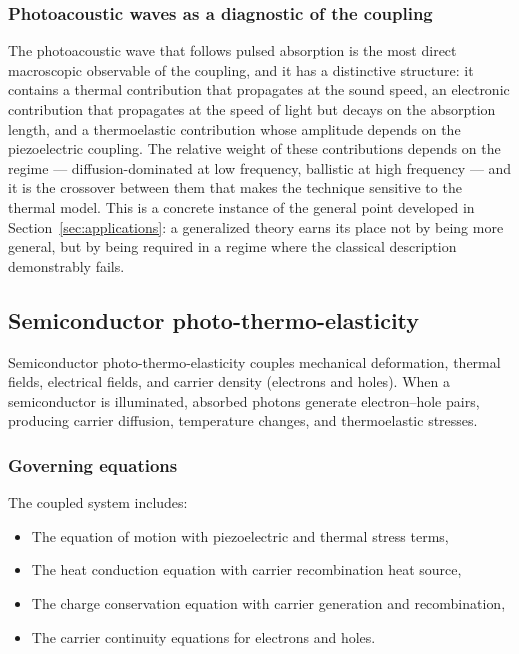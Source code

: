 \subsubsection{Photoacoustic waves as a diagnostic of the coupling}

The photoacoustic wave that follows pulsed absorption is the most direct macroscopic observable of the coupling, and it has a distinctive structure: it contains a thermal contribution that propagates at the sound speed, an electronic contribution that propagates at the speed of light but decays on the absorption length, and a thermoelastic contribution whose amplitude depends on the piezoelectric coupling. The relative weight of these contributions depends on the regime --- diffusion-dominated at low frequency, ballistic at high frequency --- and it is the crossover between them that makes the technique sensitive to the thermal model. This is a concrete instance of the general point developed in Section~\ref{sec:applications}: a generalized theory earns its place not by being more general, but by being required in a regime where the classical description demonstrably fails.

\subsection{Semiconductor photo-thermo-elasticity}
\label{sec:5.6}

Semiconductor photo-thermo-elasticity couples mechanical deformation, thermal fields, electrical fields, and carrier density (electrons and holes). When a semiconductor is illuminated, absorbed photons generate electron--hole pairs, producing carrier diffusion, temperature changes, and thermoelastic stresses.

\subsubsection{Governing equations}

The coupled system includes:
\begin{itemize}
\item The equation of motion with piezoelectric and thermal stress terms,
\item The heat conduction equation with carrier recombination heat source,
\item The charge conservation equation with carrier generation and recombination,
\item The carrier continuity equations for electrons and holes.
\end{itemize}

